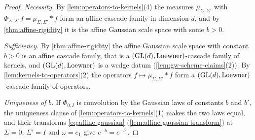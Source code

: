 \begin{proof}
\leanok
\emph{Necessity.} By \ref{lem:operators-to-kernels}(4) the measures $\mu_{\Sigma,\Sigma'}$
with $\Phi_{\Sigma,\Sigma'}f = \mu_{\Sigma,\Sigma'} * f$ form an affine cascade family in dimension
$d$, and by \ref{thm:affine-rigidity} it is the affine Gaussian scale space with some $b > 0$.

\emph{Sufficiency.} By \ref{thm:affine-rigidity} the affine Gaussian scale space with constant
$b > 0$ is an affine cascade family, that is a $(\mathrm{GL}(d), \text{Loewner})$-cascade family of kernels,
and $(\mathrm{GL}(d), \text{Loewner})$ is a wedge datum (\ref{lem:gw-scheme-claims}(2)). By
\ref{lem:kernels-to-operators}(2) the operators $f \mapsto \mu_{\Sigma,\Sigma'} * f$ form a
$(\mathrm{GL}(d), \text{Loewner})$-cascade family of operators.

\emph{Uniqueness of $b$.} If $\Phi_{0,I}$ is convolution by the Gaussian laws of constants $b$ and
$b'$, the uniqueness clause of \ref{lem:operators-to-kernels}(1) makes the two laws equal, and their
transforms \ref{eq:affine-gaussian} (\ref{lem:affine-gaussian-transform}) at $\Sigma = 0$, $\Sigma' = I$
and $\omega = e_1$ give $e^{-b} = e^{-b'}$.
\end{proof}
